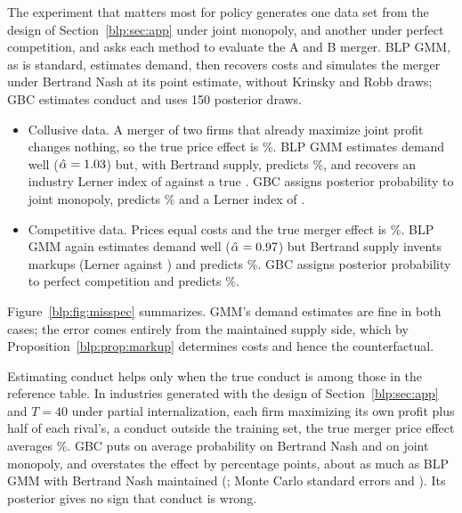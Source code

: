 The experiment that matters most for policy generates one data set from the design of Section~\ref{blp:sec:app} under joint monopoly, and another under perfect competition, and asks each method to evaluate the A and B merger. BLP GMM, as is standard, estimates demand, then recovers costs and simulates the merger under Bertrand Nash at its point estimate, without Krinsky and Robb draws; GBC estimates conduct and uses 150 posterior draws.

\begin{itemize}
\item Collusive data. A merger of two firms that already maximize joint profit changes nothing,
so the true price effect is \nummscollusiontrue\%. BLP GMM estimates demand well ($\hat\alpha = 1.03$) but, with Bertrand
supply, predicts \nummscollusiongmm\%, and recovers an industry Lerner index of \nummscollusionlgmm{} against a true
\nummscollusionltrue. GBC assigns posterior probability \nummscollusionpc{} to joint monopoly,
predicts \nummscollusiongbc\% and a Lerner index of \nummscollusionlgbc.
\item Competitive data. Prices equal costs and the true merger effect is \nummsperfecttrue\%.
BLP GMM again estimates demand well ($\hat\alpha = 0.97$) but Bertrand supply invents markups (Lerner \nummsperfectlgmm{} against
\nummsperfectltrue) and predicts \nummsperfectgmm\%. GBC assigns posterior probability
\nummsperfectpc{} to perfect competition and predicts \nummsperfectgbc\%.
\end{itemize}

Figure~\ref{blp:fig:misspec} summarizes. GMM's demand estimates are fine in both cases; the error comes entirely from the maintained supply side, which by Proposition~\ref{blp:prop:markup} determines costs and hence the counterfactual.

Estimating conduct helps only when the true conduct is among those in the reference table. In \nummspartn{} industries generated with the design of Section~\ref{blp:sec:app} and $T=40$ under partial internalization, each firm maximizing its own profit plus half of each rival's, a conduct outside the training set, the true merger price effect averages \nummsparttruedp\%. GBC puts on average probability \nummspartpcbert{} on Bertrand Nash and \nummspartpccoll{} on joint monopoly, and overstates the effect by \nummspartgbcbiasdp{} percentage points, about as much as BLP GMM with Bertrand Nash maintained (\nummspartgmmbiasdp{}; Monte Carlo standard errors \nummspartgbcsedp{} and \nummspartgmmsedp{}). Its posterior gives no sign that conduct is wrong.

